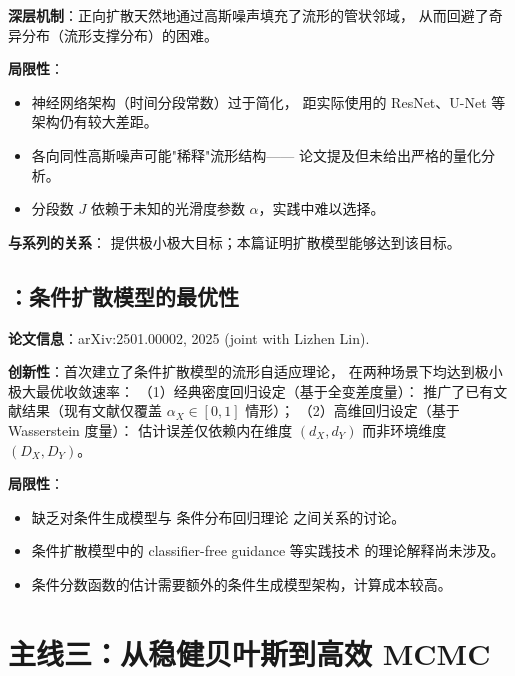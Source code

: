 \textbf{深层机制}：正向扩散天然地通过高斯噪声填充了流形的管状邻域，
从而回避了奇异分布（流形支撑分布）的困难。

\textbf{局限性}：

\begin{itemize}
    \item 神经网络架构（时间分段常数）过于简化，
          距实际使用的 ResNet、U-Net 等架构仍有较大差距。
    \item 各向同性高斯噪声可能"稀释"流形结构——
          论文提及但未给出严格的量化分析。
    \item 分段数 $J$ 依赖于未知的光滑度参数 $\alpha$，实践中难以选择。
\end{itemize}

\textbf{与系列的关系}：
\citep{tang2022minimax} 提供极小极大目标；本篇证明扩散模型能够达到该目标。

\subsection{\citep{tang2025conditional}：条件扩散模型的最优性}\label{sec:ch0-arxiv2025b}

\textbf{论文信息}：arXiv:2501.00002, 2025 (joint with Lizhen Lin).

\textbf{创新性}：首次建立了条件扩散模型的流形自适应理论，
在两种场景下均达到极小极大最优收敛速率：
（1）经典密度回归设定（基于全变差度量）：
推广了已有文献结果（现有文献仅覆盖 $\alpha_X\in[0,1]$ 情形）；
（2）高维回归设定（基于 Wasserstein 度量）：
估计误差仅依赖内在维度 $(d_X,d_Y)$ 而非环境维度 $(D_X,D_Y)$。

\textbf{局限性}：

\begin{itemize}
    \item 缺乏对条件生成模型与 \citep{tang2025regression} 条件分布回归理论
          之间关系的讨论。
    \item 条件扩散模型中的 classifier-free guidance 等实践技术
          的理论解释尚未涉及。
    \item 条件分数函数的估计需要额外的条件生成模型架构，计算成本较高。
\end{itemize}

\section{主线三：从稳健贝叶斯到高效 MCMC}\label{sec:line3}

